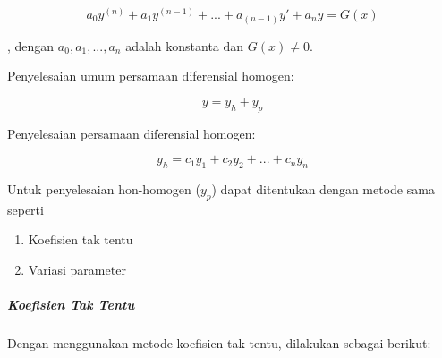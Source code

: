 \begin{equation} a_0 y^{(n)} + a_1  y^{(n -1)} + ... + a_(n -1) y' + a_n y = G(x) \end{equation}

, dengan \begin{math} a_0, a_1, ..., a_n \end{math} adalah konstanta dan \begin{math} G(x) \neq 0 \end{math}.

Penyelesaian umum persamaan diferensial homogen:

\begin{displaymath} y = y_h + y_p \end{displaymath}

Penyelesaian persamaan diferensial homogen:

\begin{displaymath} y_h = c_1 y_1 + c_2 y_2 + ... + c_n y_n \end{displaymath}

Untuk penyelesaian hon-homogen (\begin{math} y_p \end{math}) dapat ditentukan dengan metode sama seperti

\begin{enumerate}[1.]

	\item Koefisien tak tentu
	\item Variasi parameter

\end{enumerate}

\subparagraph{Koefisien Tak Tentu}
\label{parff:koefisien2}

Dengan menggunakan metode koefisien tak tentu, dilakukan sebagai berikut:

